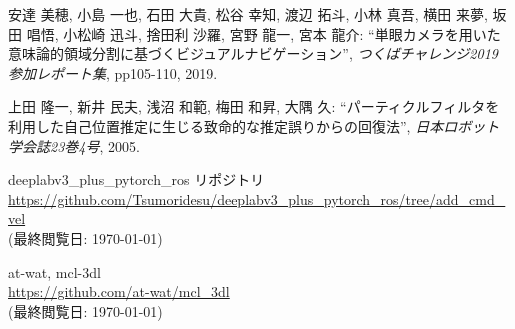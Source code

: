 \documentclass[uplatex, twocolumn, 9pt]{jsproceedings}
\begin{document}
\begin{thebibliography}{99}
安達 美穂, 小島 一也, 石田 大貴, 松谷 幸知, 渡辺 拓斗, 小林 真吾, 横田 来夢, 坂田 唱悟, 小松崎 迅斗, 捨田利 沙羅, 宮野 龍一, 宮本 龍介: ``単眼カメラを用いた意味論的領域分割に基づくビジュアルナビゲーション'', \textit{つくばチャレンジ2019 参加レポート集}, pp105-110, 2019.

上田 隆一, 新井 民夫, 浅沼 和範, 梅田 和昇, 大隅 久: ``パーティクルフィルタを利用した自己位置推定に生じる致命的な推定誤りからの回復法'', \textit{日本ロボット学会誌23巻4号}, 2005.

deeplabv3\_plus\_pytorch\_ros リポジトリ\\
\url{https://github.com/Tsumoridesu/deeplabv3_plus_pytorch_ros/tree/add_cmd_vel}\\
(最終閲覧日: \today)

at-wat, mcl-3dl\\
\url{https://github.com/at-wat/mcl_3dl}\\
(最終閲覧日: \today)

\end{thebibliography}
\normalsize
\end{document}
